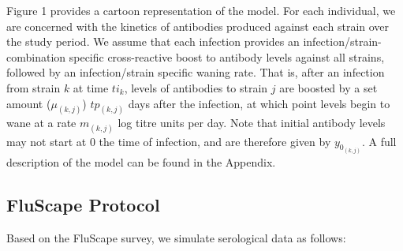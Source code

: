\documentclass[a4paper,11pt,twoside]{article}
\begin{document}
Figure 1 provides a cartoon representation of the model. For each individual, we are concerned with the kinetics of antibodies produced against each strain over the study period. We assume that each infection provides an infection/strain-combination specific cross-reactive boost to antibody levels against all strains, followed by an infection/strain specific waning rate. That is, after an infection from strain $k$ at time $ti_k$, levels of antibodies to strain $j$ are boosted by a set amount ($\mu_{(k,j)}$) $tp_{(k,j)}$ days after the infection, at which point levels begin to wane at a rate $m_{(k,j)}$ log titre units per day. Note that initial antibody levels may not start at 0 the time of infection, and are therefore given by $y_{0_{(k,j)}}$. A full description of the model can be found in the Appendix.

\subsection{FluScape Protocol}
Based on the FluScape survey, we simulate serological data as follows:
\end{document}
